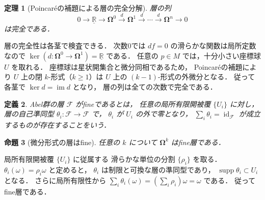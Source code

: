 \documentclass[a5paper,10pt,onecolumn]{jsarticle}
\makeatletter
\theoremstyle{mathnotetheorem}
\newtheorem{theorem}{定理}[section]
\newtheorem{definition}[theorem]{定義}
\newtheorem{proposition}[theorem]{命題}
\renewcommand{\proofname}{証明}
\renewenvironment{proof}[1][\proofname]{%
  \par\pushQED{\qed}\normalfont\topsep4\p@\@plus2\p@\relax
  \trivlist\item[\hskip\labelsep\bfseries #1]\ignorespaces
}{\popQED\endtrivlist\@endpefalse}
\makeatother
\begin{document}
\begin{theorem}[Poincar\'eの補題による層の完全分解]
\label{thm:form-resolution}
層の列
\[
 0\to\underline{\mathbb R}\to
 \boldsymbol\Omega^0\xrightarrow d
 \boldsymbol\Omega^1\xrightarrow d\cdots
 \xrightarrow d\boldsymbol\Omega^n\to0
\]
は完全である．
\end{theorem}
\begin{proof}
層の完全性は各茎で検査できる．
次数0では $df=0$ の滑らかな関数は局所定数なので
$\ker(d:\boldsymbol\Omega^0\to\boldsymbol\Omega^1)
=\underline{\mathbb R}$ である．
任意の $p\in M$ では，十分小さい座標球 $U$ を取れる．
座標球は星状開集合と微分同相であるため，
Poincar\'eの補題により $U$ 上の閉 $k$-形式（$k\ge1$）は
$U$ 上の $(k-1)$-形式の外微分となる．
従って各茎で
$\ker d=\operatorname{im}d$ となり，
層の列は全ての次数で完全である．
\end{proof}

\begin{definition}
Abel群の層 $\mathcal F$ が\emph{fine}であるとは，
任意の局所有限開被覆 $\{U_i\}$ に対し，
層の自己準同型 $\theta_i:\mathcal F\to\mathcal F$ で，
$\theta_i$ が $U_i$ の外で零となり，
$\sum_i\theta_i=\operatorname{id}_{\mathcal F}$
が成立するものが存在することをいう．
\end{definition}

\begin{proposition}[微分形式の層はfine]\label{prop:fine-forms}
任意の $k$ について $\boldsymbol\Omega^k$ はfine層である．
\end{proposition}
\begin{proof}
局所有限開被覆 $\{U_i\}$ に従属する
滑らかな単位の分割 $\{\rho_i\}$ を取る．
$\theta_i(\omega)=\rho_i\omega$ と定めると，
$\theta_i$ は制限と可換な層の準同型であり，
$\operatorname{supp}\theta_i\subset U_i$ となる．
さらに局所有限性から
$\sum_i\theta_i(\omega)
=(\sum_i\rho_i)\omega=\omega$ である．
従ってfine層である．
\end{proof}
\end{document}
